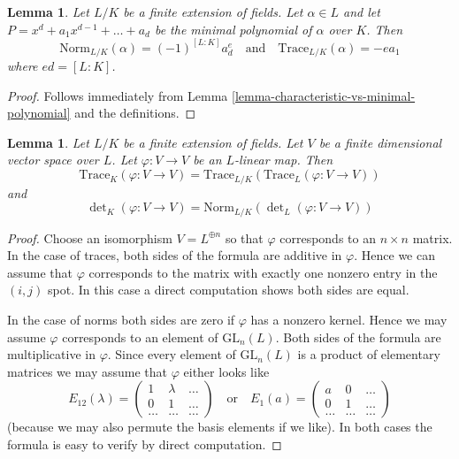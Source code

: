 \documentclass{stacks-project}
\theoremstyle{plain}
\newtheorem{lemma}[subsection]{Lemma}
\theoremstyle{definition}
\theoremstyle{remark}
\numberwithin{equation}{subsection}
\begin{document}
\begin{lemma}
\label{lemma-trace-and-norm-from-minimal-polynomial}
Let $L/K$ be a finite extension of fields. Let $\alpha \in L$ and let
$P = x^d + a_1 x^{d - 1} + \ldots + a_d$
be the minimal polynomial of $\alpha$ over $K$. Then
$$
\text{Norm}_{L/K}(\alpha) = (-1)^{[L : K]} a_d^e
\quad\text{and}\quad
\text{Trace}_{L/K}(\alpha) = - e a_1
$$
where $e d = [L : K]$.
\end{lemma}

\begin{proof}
Follows immediately from Lemma \ref{lemma-characteristic-vs-minimal-polynomial}
and the definitions.
\end{proof}

\begin{lemma}
\label{lemma-trace-and-norm-linear}
Let $L/K$ be a finite extension of fields. Let $V$ be a finite dimensional
vector space over $L$. Let $\varphi : V \to V$ be an $L$-linear map.
Then
$$
\text{Trace}_K(\varphi : V \to V) =
\text{Trace}_{L/K}(\text{Trace}_L(\varphi : V \to V))
$$
and
$$
\det\nolimits_K(\varphi : V \to V) =
\text{Norm}_{L/K}(\det\nolimits_L(\varphi : V \to V))
$$
\end{lemma}

\begin{proof}
Choose an isomorphism $V = L^{\oplus n}$ so that $\varphi$ corresponds
to an $n \times n$ matrix. In the case of traces, both sides of the formula
are additive in $\varphi$. Hence we can assume that $\varphi$
corresponds to the matrix with exactly one nonzero entry in the $(i, j)$ spot.
In this case a direct computation shows both sides are equal.

\medskip\noindent
In the case of norms both sides are zero if $\varphi$ has a nonzero kernel.
Hence we may assume $\varphi$ corresponds to an element of
$\text{GL}_n(L)$. Both sides of the formula are multiplicative in $\varphi$.
Since every element of $\text{GL}_n(L)$ is a product of elementary
matrices we may assume that $\varphi$ either looks like
$$
E_{12}(\lambda) =
\left(
\begin{matrix}
1 & \lambda & \ldots \\
0 & 1 & \ldots \\
\ldots & \ldots & \ldots
\end{matrix}
\right)
\quad\text{or}\quad
E_1(a) =
\left(
\begin{matrix}
a & 0 & \ldots \\
0 & 1 & \ldots \\
\ldots & \ldots & \ldots
\end{matrix}
\right)
$$
(because we may also permute the basis elements if we like).
In both cases the formula is easy to verify by direct computation.
\end{proof}
\end{document}
